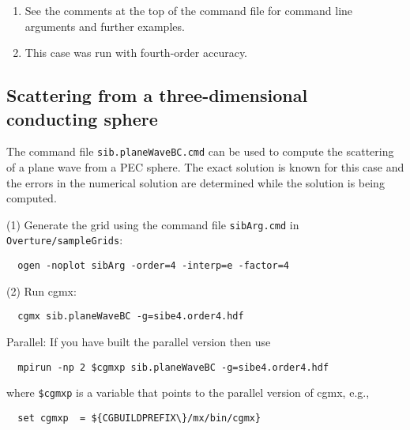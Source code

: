 \begin{enumerate}
  \item See the comments at the top of the command file for command line arguments and further examples.
  \item This case was run with fourth-order accuracy.
\end{enumerate}


\clearpage





\clearpage
\subsection{Scattering from a three-dimensional conducting sphere} \label{sec:sphere3dScat}

The command file {\tt sib.planeWaveBC.cmd} can be used to compute the scattering
of a plane wave from a PEC sphere. The exact solution is known for this case
and the errors in the numerical solution are determined while the solution
is being computed.


\noindent (1) Generate the grid using the command file {\tt sibArg.cmd} in {\tt Overture/sampleGrids}:
\begin{verbatim}
  ogen -noplot sibArg -order=4 -interp=e -factor=4
\end{verbatim}

\noindent (2) Run cgmx: 
\begin{verbatim}
  cgmx sib.planeWaveBC -g=sibe4.order4.hdf
\end{verbatim}

\noindent Parallel: If you have built the parallel version then use 
\begin{verbatim}
  mpirun -np 2 $cgmxp sib.planeWaveBC -g=sibe4.order4.hdf
\end{verbatim} %
where {\tt \$cgmxp} is a variable that points to the parallel version of cgmx, e.g.,
\begin{verbatim}
  set cgmxp  = ${CGBUILDPREFIX\}/mx/bin/cgmx}
\end{verbatim} %

